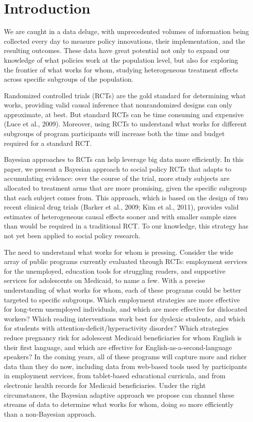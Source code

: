 \documentclass{acm_proc_article-sp}
\begin{document}
\section{Introduction}
We are caught in a data deluge, with unprecedented volumes of information being collected every day to measure policy innovations, their implementation, and the resulting outcomes. 
These data have great potential not only to expand our knowledge of what policies work at the population level, but also for exploring the frontier of what works for whom, studying heterogeneous treatment effects across specific subgroups of the population.

Randomized controlled trials (RCTs) are the gold standard for determining what works, providing valid causal inference that nonrandomized designs can only approximate, at best. But standard RCTs can be time consuming and expensive (Luce et al., 2009). 
Moreover, using RCTs to understand what works for different subgroups of program participants will increase both the time and budget required for a standard RCT. 

Bayesian approaches to RCTs can help leverage big data more efficiently. 
In this paper, we present a Bayesian approach to social policy RCTs that adapts to accumulating evidence: over the course of the trial, more study subjects are allocated to treatment arms that are more promising, given the specific subgroup that each subject comes from. 
This approach, which is based on the design of two recent clinical drug trials (Barker et al., 2009; Kim et al., 2011), provides valid estimates of heterogeneous causal effects sooner and with smaller sample sizes than would be required in a traditional RCT. 
To our knowledge, this strategy has not yet been applied to social policy research. 

The need to understand what works for whom is pressing. 
Consider the wide array of public programs currently evaluated through RCTs: employment services for the unemployed, education tools for struggling readers, and supportive services for adolescents on Medicaid, to name a few. With a precise understanding of what works for whom, each of these programs could be better targeted to specific subgroups. 
Which employment strategies are more effective for long-term unemployed individuals, and which are more effective for dislocated workers? 
Which reading interventions work best for dyslexic students, and which for students with attention-deficit/hyperactivity disorder? 
Which strategies reduce pregnancy risk for adolescent Medicaid beneficiaries for whom English is their first language, and which are effective for English-as-a-second-language speakers? 
In the coming years, all of these programs will capture more and richer data than they do now, including data from web-based tools used by participants in employment services, from tablet-based educational curricula, and from electronic health records for Medicaid beneficiaries. 
Under the right circumstances, the Bayesian adaptive approach we propose can channel these streams of data to determine what works for whom, doing so more efficiently than a non-Bayesian approach.
\end{document}
